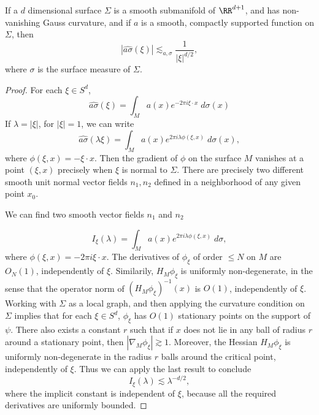 \begin{theorem}
  If a $d$ dimensional surface $\Sigma$ is a smooth submanifold of $\RR^{d+1}$, and has non-vanishing Gauss curvature, and if $a$ is a smooth, compactly supported function on $\Sigma$, then
    \[ |\widehat{a \sigma}(\xi)| \lesssim_{a,\sigma} \frac{1}{|\xi|^{d/2}}, \]
    where $\sigma$ is the surface measure of $\Sigma$.
\end{theorem}
\begin{proof}
  For each $\xi \in S^d$,
  \[ \widehat{a \sigma}(\xi) = \int_M a(x) e^{- 2 \pi i \xi \cdot x}\; d\sigma(x) \]
  If $\lambda = |\xi|$, for $|\xi| = 1$, we can write
  \[ \widehat{a \sigma}(\lambda \xi) = \int_M a(x) e^{2 \pi i \lambda \phi(\xi,x)}\; d\sigma(x), \]
  where $\phi(\xi,x) = - \xi \cdot x$. Then the gradient of $\phi$ on the
  surface $M$ vanishes at a point $(\xi,x)$ precisely when $\xi$ is normal to
  $\Sigma$. There are precisely two different smooth unit normal vector
  fields $n_1,n_2$ defined in a neighborhood of any given point $x_0$.


  We can find two smooth vector fields $n_1$ and $n_2$

  \[ I_\xi(\lambda) = \int_M a(x) e^{2 \pi i \lambda \phi(\xi,x)}\; d\sigma, \]
  where $\phi(\xi,x) = -2 \pi i \xi \cdot x$. The derivatives of $\phi_\xi$ of order $\leq N$ on $M$ are $O_N(1)$, independently of $\xi$. Similarily, $H_M \phi_\xi$ is uniformly non-degenerate, in the sense that the operator norm of $(H_M \phi_\xi)^{-1}(x)$ is $O(1)$, independently of $\xi$. Working with $\Sigma$ as a local graph, and then applying the curvature condition on $\Sigma$ implies that for each $\xi \in S^d$, $\phi_\xi$ has $O(1)$ stationary points on the support of $\psi$. There also exists a constant $r$ such that if $x$ does not lie in any ball of radius $r$ around a stationary point, then $|\nabla_M \phi_\xi| \gtrsim 1$. Moreover, the Hessian $H_M \phi_\xi$ is uniformly non-degenerate in the radius $r$ balls around the critical point, independently of $\xi$. Thus we can apply the last result to conclude
  \[ I_\xi(\lambda) \lesssim \lambda^{-d/2}, \]
  where the implicit constant is independent of $\xi$, because all the required derivatives are uniformly bounded.
\begin{comment}


\end{comment}
\end{proof}
